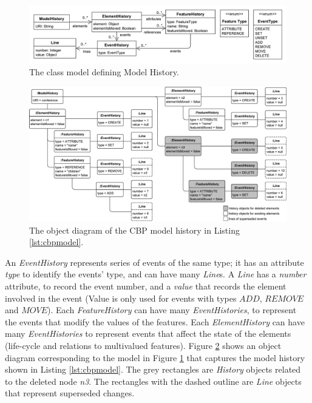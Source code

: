 \documentclass{llncs}
\begin{document}
\vspace{-20pt}    
\begin{figure}[ht]
\centering
\includegraphics[width=\linewidth]{object_history}
\caption{The class model defining Model History.}
\label{fig:object_history}
    \end{figure}

\vspace{-30pt}
\begin{figure}[ht]
\centering
\includegraphics[width=\linewidth]{history_structure}
\caption{The object diagram of the CBP model history in Listing \ref{lst:cbpmodel}.}
\label{fig:history_structure}
\end{figure}
    
    
    An \emph{EventHistory} represents series of events of the same type; it has an attribute \emph{type} to identify the events' type, and can have many \emph{Line}s. A \emph{Line} has a \emph{number} attribute, to record the event number, and a \emph{value} that records the element involved in the event (Value is only used for events with types \emph{$ADD$}, \emph{$REMOVE$} and \emph{$MOVE$}). Each \emph{FeatureHistory} can have many \emph{EventHistories}, to represent the events that modify the values of the features. Each \emph{ElementHistory} can have many \emph{EventHistories} to represent events that affect the state of the elements (life-cycle and relations to multivalued features). Figure \ref{fig:history_structure} shows an object diagram corresponding to the model in Figure \ref{fig:object_history} that captures the model history shown in Listing \ref{lst:cbpmodel}. The grey rectangles are \emph{History} objects related to the deleted node \emph{n3}. The rectangles with the dashed outline are \emph{Line} objects that represent superseded changes. 
    
\end{document}
